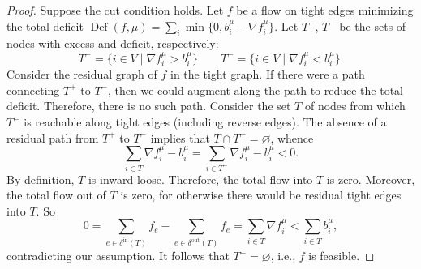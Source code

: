 \documentclass[11pt]{article}
\theoremstyle{definition}
\theoremstyle{definition}
\theoremstyle{definition}
\newcommand{\fu}{f^{\mu}}
\newcommand{\nfiu}{\nabla \fu_i}
\newcommand{\biu}{b_{i}^{\mu}}
\newcommand{\din}{\delta^{\text{in}}}
\newcommand{\dout}{\delta^{\text{out}}}
\DeclareMathOperator{\Def}{Def}
\begin{document}
	\begin{proof}
		Suppose the cut condition holds. Let $f$ be a flow on tight edges minimizing
		the total deficit $\Def(f, \mu) = \sum_i \min\{0, \biu - \nfiu\}$. Let
		$T^+$, $T^-$ be the sets of nodes with excess and deficit, respectively:
		\[
			T^+ = \{i \in V \mid \nfiu > \biu \} \qquad T^- = \{i \in V \mid \nfiu < \biu \}.
		\]
		Consider the residual graph of $f$ in the tight graph. If there were a path
		connecting $T^+$ to $T^-$, then we could augment along the path
		to reduce the total deficit. Therefore, there is no such path. Consider the
		set $T$ of nodes from which $T^-$ is reachable along tight edges (including reverse edges).
		The absence of a residual path from $T^+$ to $T^-$
        implies that $T \cap T^+ = \varnothing$, whence
		\[ \sum_{i \in T} \nfiu - \biu = \sum_{i \in T^-} \nfiu - \biu < 0. \]
		By definition, $T$ is inward-loose. Therefore, the total flow into $T$ is zero.
        Moreover, the total flow out of $T$ is zero, for otherwise there would be
        residual tight edges into $T$. So
		\[ 0 = \sum_{e \in \din(T)} f_e - \sum_{e \in \dout(T)} f_e
		     = \sum_{i \in T} \nfiu < \sum_{i \in T} \biu, \]
		contradicting our assumption. It follows that $T^- = \varnothing$, i.e., $f$
		is feasible.
	\end{proof}
    
\end{document}
